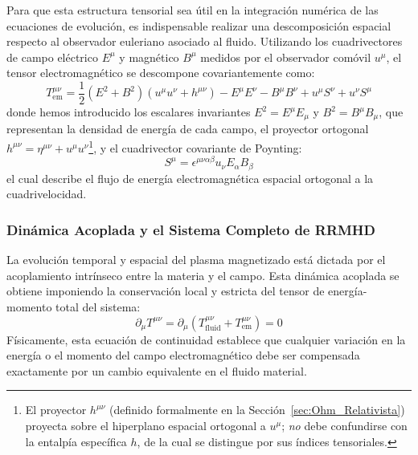 Para que esta estructura tensorial sea útil en la integración numérica de las ecuaciones de evolución, es indispensable realizar una descomposición espacial respecto al observador euleriano asociado al fluido. Utilizando los cuadrivectores de campo eléctrico $E^\mu$ y magnético $B^\mu$ medidos por el observador comóvil $u^\mu$, el tensor electromagnético se descompone covariantemente como:
\begin{equation}
    T^{\mu\nu}_{\text{em}} = \frac{1}{2}(E^2 + B^2) \left( u^\mu u^\nu + h^{\mu\nu} \right) - E^\mu E^\nu - B^\mu B^\nu + u^\mu S^\nu + u^\nu S^\mu
    \label{eq:T_em_decomp}
\end{equation}
donde hemos introducido los escalares invariantes $E^2 = E^\mu E_\mu$ y $B^2 = B^\mu B_\mu$, que representan la densidad de energía de cada campo, el proyector ortogonal $h^{\mu\nu} = \eta^{\mu\nu} + u^\mu u^\nu$\footnote{El proyector $h^{\mu\nu}$ (definido formalmente en la Sección~\ref{sec:Ohm_Relativista}) proyecta sobre el hiperplano espacial ortogonal a $u^\mu$; \emph{no} debe confundirse con la entalpía específica $h$, de la cual se distingue por sus índices tensoriales.}, y el cuadrivector covariante de Poynting:
\begin{equation}
    S^\mu = \epsilon^{\mu\nu\alpha\beta} u_\nu E_\alpha B_\beta
\end{equation}
el cual describe el flujo de energía electromagnética espacial ortogonal a la cuadrivelocidad.

\subsubsection{Dinámica Acoplada y el Sistema Completo de RRMHD}

\primerparrafo La evolución temporal y espacial del plasma magnetizado está dictada por el acoplamiento intrínseco entre la materia y el campo. Esta dinámica acoplada se obtiene imponiendo la conservación local y estricta del tensor de energía-momento total del sistema:
\begin{equation}
    \partial_\mu T^{\mu\nu} = \partial_\mu \left( T^{\mu\nu}_{\text{fluid}} + T^{\mu\nu}_{\text{em}} \right) = 0
\end{equation}
Físicamente, esta ecuación de continuidad establece que cualquier variación en la energía o el momento del campo electromagnético debe ser compensada exactamente por un cambio equivalente en el fluido material. 


